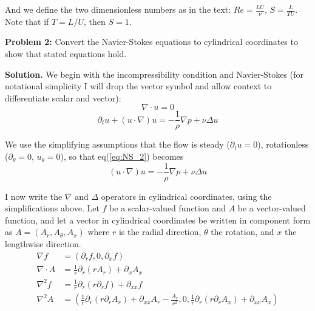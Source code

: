 \documentclass[11pt]{article}
\begin{document}
And we define the two dimensionless numbers as in the text: $Re = \frac{LU}{\nu}$, $S = \frac{L}{TU}$. Note that if $T = L/U$, then $S = 1$.

\newpage

\textbf{Problem 2:} Convert the Navier-Stokes equations to cylindrical coordinates to show that stated equations hold.

\textbf{Solution.}
We begin with the incompressibility condition and Navier-Stokes (for notational simplicity I will drop the vector symbol and allow context to differentiate scalar and vector):
\begin{equation}
  \label{eq:incom}
  \nabla \cdot u = 0
\end{equation}
\begin{equation}
  \label{eq:NS_2}
  \partial_t u + (u \cdot \nabla)u = -\frac{1}{\rho}\nabla p + \nu \Delta u
\end{equation}

We use the simplifying assumptions that the flow is steady ($\partial_tu=0$), rotationless ($\partial_\theta = 0$, $u_\theta = 0$), so that eq(\ref{eq:NS_2}) becomes
\begin{equation}
  \label{eq:simpleNS}
  (u \cdot \nabla)u = -\frac{1}{\rho}\nabla p + \nu \Delta u
\end{equation}

I now write the $\nabla$ and $\Delta$ operators in cylindrical coordinates, using the simplifications above. Let $f$ be a scalar-valued function and $A$ be a vector-valued function, and let a vector in cylindrical coordinates be written in component form as $A = (A_r, A_\theta, A_x)$ where $r$ is the radial direction, $\theta$ the rotation, and $x$ the lengthwise direction.
\begin{align}
  \label{eq:nablaCyl}
  \nabla f &= \left( \partial_r f, 0, \partial_x f \right)\\
  \nabla \cdot A &= \frac{1}{r} \partial_r(rA_r) + \partial_x A_x\\
  \nabla^2 f &= \frac{1}{r} \partial_r \left( r \partial_r f \right) + \partial_{xx}f\\
  \nabla^2 A &= \left( \frac{1}{r} \partial_r (r \partial_r A_r) + \partial_{xx}A_r - \frac{A_r}{r^2}, 0, \frac{1}{r}\partial_r(r\partial_r A_x) + \partial_{xx}A_x\right)
\end{align}
\end{document}
